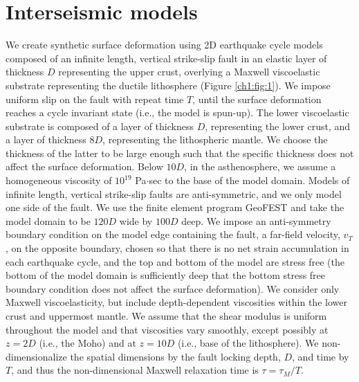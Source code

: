 \section{Interseismic models}
We create synthetic surface deformation using 2D earthquake cycle
models composed of an infinite length, vertical strike-slip fault in
an elastic layer of thickness $D$ representing the upper crust,
overlying a Maxwell viscoelastic substrate representing the ductile
lithosphere (Figure \ref{ch1:fig:1}). We impose uniform slip on the
fault with repeat time $T$, until the surface deformation reaches a
cycle invariant state (i.e., the model is spun-up). The lower
viscoelastic substrate is composed of a layer of thickness $D$,
representing the lower crust, and a layer of thickness $8D$,
representing the lithospheric mantle. We choose the thickness of the
latter to be large enough such that the specific thickness does not
affect the surface deformation.  Below $10D$, in the asthenosphere, we
assume a homogeneous viscosity of $10^{19}$ Pa$\cdot$sec to the base
of the model domain.  Models of infinite length, vertical strike-slip
faults are anti-symmetric, and we only model one side of the fault. We
use the finite element program GeoFEST \citep{Lyzenga2000} and take
the model domain to be $120D$ wide by $100D$ deep. We impose an
anti-symmetry boundary condition on the model edge containing the
fault, a far-field velocity, $v_T$, on the opposite boundary, chosen
so that there is no net strain accumulation in each earthquake cycle,
and the top and bottom of the model are stress free (the bottom of the
model domain is sufficiently deep that the bottom stress free boundary
condition does not affect the surface deformation).  We consider only
Maxwell viscoelasticity, but include depth-dependent viscosities
within the lower crust and uppermost mantle. We assume that the shear
modulus is uniform throughout the model and that viscosities vary
smoothly, except possibly at $z = 2D$ (i.e., the Moho) and at $z =
10D$ (i.e., base of the lithosphere).  We non-dimensionalize the
spatial dimensions by the fault locking depth, $D$, and time by $T$,
and thus the non-dimensional Maxwell relaxation time is $\tau =
\tau_M/T$.

